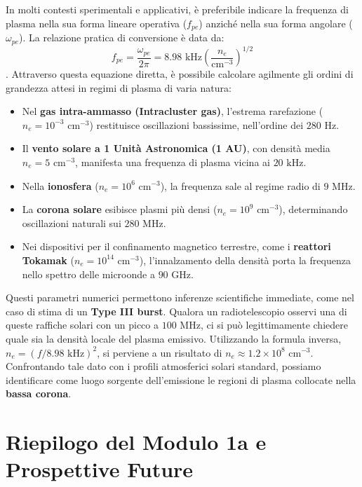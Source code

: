 In molti contesti sperimentali e applicativi, è preferibile indicare la frequenza di plasma nella sua forma lineare operativa ($f_{pe}$) anziché nella sua forma angolare ($\omega_{pe}$). La relazione pratica di conversione è data da:
\begin{equation}
f_{pe} = \frac{\omega_{pe}}{2\pi} = 8.98 \text{ kHz} \left( \frac{n_e}{\text{cm}^{-3}} \right)^{1/2}
\end{equation}
. Attraverso questa equazione diretta, è possibile calcolare agilmente gli ordini di grandezza attesi in regimi di plasma di varia natura:
\begin{itemize}
\item Nel \textbf{gas intra-ammasso (Intracluster gas)}, l'estrema rarefazione ($n_e = 10^{-3} \text{ cm}^{-3}$) restituisce oscillazioni bassissime, nell'ordine dei $280 \text{ Hz}$.
\item Il \textbf{vento solare a 1 Unità Astronomica (1 AU)}, con densità media $n_e = 5 \text{ cm}^{-3}$, manifesta una frequenza di plasma vicina ai $20 \text{ kHz}$.
\item Nella \textbf{ionosfera} ($n_e = 10^6 \text{ cm}^{-3}$), la frequenza sale al regime radio di $9 \text{ MHz}$.
\item La \textbf{corona solare} esibisce plasmi più densi ($n_e = 10^9 \text{ cm}^{-3}$), determinando oscillazioni naturali sui $280 \text{ MHz}$.
\item Nei dispositivi per il confinamento magnetico terrestre, come i \textbf{reattori Tokamak} ($n_e = 10^{14} \text{ cm}^{-3}$), l'innalzamento della densità porta la frequenza nello spettro delle microonde a $90 \text{ GHz}$.
\end{itemize}

Questi parametri numerici permettono inferenze scientifiche immediate, come nel caso di stima di un \textbf{Type III burst}. Qualora un radiotelescopio osservi una di queste raffiche solari con un picco a $100 \text{ MHz}$, ci si può legittimamente chiedere quale sia la densità locale del plasma emissivo. Utilizzando la formula inversa, $n_e = (f / 8.98 \text{ kHz})^2$, si perviene a un risultato di $n_e \approx 1.2 \times 10^8 \text{ cm}^{-3}$. Confrontando tale dato con i profili atmosferici solari standard, possiamo identificare come luogo sorgente dell'emissione le regioni di plasma collocate nella \textbf{bassa corona}.

\section{Riepilogo del Modulo 1a e Prospettive Future}

